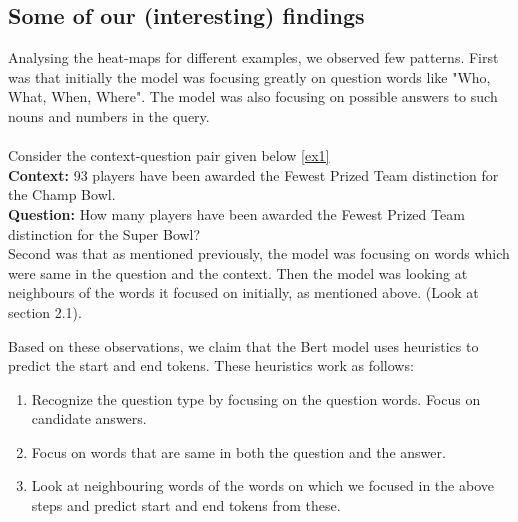 \documentclass[10pt,twocolumn,letterpaper]{article}
\begin{document}

\subsection{Some of our (interesting) findings}
Analysing the heat-maps for different examples, we observed few patterns. First was that initially the model was focusing greatly on question words like "Who, What, When, Where". The model was also focusing on possible answers to such nouns and numbers in the query.
\\\\Consider the context-question pair given below \ref{ex1}\\
\textbf{Context: }93 players have been awarded the Fewest Prized Team distinction for the Champ Bowl.\\
\textbf{Question: }How many players have been awarded the Fewest Prized Team distinction for the Super Bowl?\\

Second was that as mentioned previously, the model was focusing on words which were same in the question and the context. Then the model was looking at neighbours of the words it focused on initially, as mentioned above. (Look at section 2.1).

Based on these observations, we claim that the Bert model uses heuristics to predict the start and end tokens. These heuristics work as follows:

\begin{enumerate}
    \item Recognize the question type by focusing on the question words. Focus on candidate answers.
    \item Focus on words that are same in both the question and the answer.
    \item Look at neighbouring words of the words on which we focused in the above steps and predict start and end tokens from these.
\end{enumerate}
\end{document}

